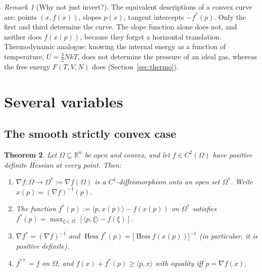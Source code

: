 \documentclass[11pt,a4paper]{article}
\newcommand{\R}{\mathbb{R}}
\newcommand{\ip}[2]{\langle #1,#2\rangle}
\DeclareMathOperator{\Hess}{Hess}
\theoremstyle{plain}
\newtheorem{theorem}{Theorem}[section]
\theoremstyle{definition}
\theoremstyle{remark}
\newtheorem{remark}[theorem]{Remark}
\begin{document}
\begin{remark}[Why not just invert?]
The equivalent descriptions of a convex curve are: points $(x,f(x))$,
slopes $p(x)$, tangent intercepts $-f^*(p)$.  Only the first and third
determine the curve.  The slope function alone does not, and neither does
$f(x(p))$, because they forget a horizontal translation.  Thermodynamic
analogue: knowing the internal energy as a function of temperature,
$U=\tfrac32NkT$, does not determine the pressure of an ideal gas,
whereas the free energy $F(T,V,N)$ does (Section~\ref{sec:thermo}).
\end{remark}

\section{Several variables}\label{sec:nd}

\subsection{The smooth strictly convex case}

\begin{theorem}\label{thm:nd}
Let $\Omega\subseteq\R^n$ be open and convex, and let $f\in C^2(\Omega)$ have
positive definite Hessian at every point.  Then:
\begin{enumerate}[label=(\roman*),nosep]
  \item $\nabla f\colon\Omega\to\Omega^*:=\nabla f(\Omega)$ is a
        $C^1$-diffeomorphism onto an open set $\Omega^*$.  Write
        $x(p)=(\nabla f)^{-1}(p)$.
  \item The function $f^*(p):=\ip{p}{x(p)}-f(x(p))$ on $\Omega^*$ satisfies
        $f^*(p)=\max_{\xi\in\Omega}\,[\ip{p}{\xi}-f(\xi)]$.
  \item $\nabla f^*=(\nabla f)^{-1}$ and
        $\Hess f^*(p)=\bigl[\Hess f(x(p))\bigr]^{-1}$ (in particular, it is
        positive definite).
  \item $f^{**}=f$ on $\Omega$, and $f(x)+f^*(p)\ge\ip{p}{x}$ with equality iff
        $p=\nabla f(x)$.
\end{enumerate}
\end{theorem}
\end{document}
